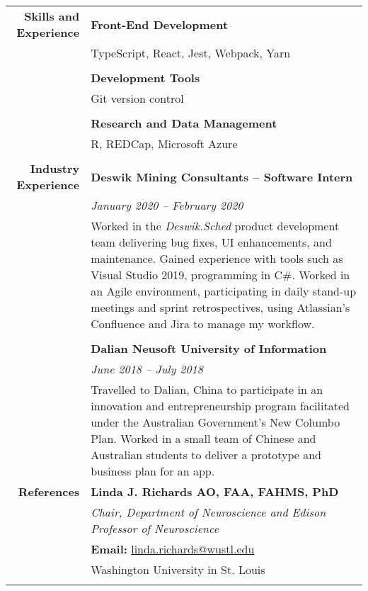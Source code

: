 \documentclass{article}
\begin{document}
\begin{longtable}{r | p{13cm}}
		\large\textbf{Skills and Experience}& \large\textbf{Front-End Development} \\
											& TypeScript, React, Jest, Webpack, Yarn \\
											& \\

											& \large\textbf{Development Tools} \\
											& Git version control \\
											& \\

											& \large\textbf{Research and Data Management} \\
											& R, REDCap, Microsoft Azure \\
											& \\

		\large\textbf{Industry Experience} 	& \large\textbf{Deswik Mining Consultants – Software Intern} \\
											& \textit{January 2020 – February 2020} \\
											& Worked in the \textit{Deswik.Sched} product development team delivering bug fixes, UI enhancements, and maintenance. Gained experience with tools such as Visual Studio 2019, programming in C\#. Worked in an Agile environment, participating in daily stand-up meetings and sprint retrospectives, using Atlassian’s Confluence and Jira to manage my workflow. \\ 
											& \\

											& \large\textbf{Dalian Neusoft University of Information} \\
											& \textit{June 2018 – July 2018} \\
											& Travelled to Dalian, China to participate in an innovation and entrepreneurship program facilitated under the Australian Government’s New Columbo Plan. Worked in a small team of Chinese and Australian students to deliver a prototype and business plan for an app. \\

											\pagebreak

		\large\textbf{References} 	  		& \large\textbf{Linda J. Richards AO, FAA, FAHMS, PhD} \\
											& \textit{Chair, Department of Neuroscience and Edison Professor of Neuroscience} \\
											& \textbf{Email:} \href{mailto:linda.richards@wustl.edu}{linda.richards@wustl.edu} \\
											& Washington University in St. Louis \\
											& \\


\end{longtable}
\end{document}
